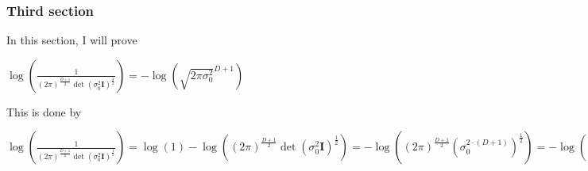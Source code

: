 \documentclass{report}
\begin{document}
\subsubsection*{Third section}
In this section, I will prove
\begin{center}
    \begin{math}
        \log \left( \frac{1}{(2 \pi)^\frac{D+1}{2} \det(\sigma_0^2 \bm{I})^\frac{1}{2}} \right) 
        = - \log \left( \sqrt{2 \pi \sigma_0^2}^{D + 1} \right)
    \end{math}
\end{center}
This is done by
\begin{center}
    \begin{math}
        \log \left( \frac{1}{(2 \pi)^\frac{D+1}{2} \det(\sigma_0^2 \bm{I})^\frac{1}{2}} \right) 
        = \log(1) - \log((2 \pi)^\frac{D+1}{2} \det(\sigma_0^2 \bm{I})^\frac{1}{2})
        = - \log((2 \pi)^\frac{D+1}{2} \left( \sigma_0^{2 \cdot (D + 1)} \right)^\frac{1}{2})
        = - \log((2 \pi)^\frac{D+1}{2} \left( \sigma_0^{2} \right)^\frac{D + 1}{2})
        = - \log((2 \pi)^{\left(\frac{1}{2}\right)^D} \left( \sigma_0^{2} \right)^{\left(\frac{1}{2}\right)^D})
        = - \log (2 \pi \sigma_0^{2})^{\left(\frac{1}{2}\right)^D}
        = - \log \sqrt{(2 \pi \sigma_0^{2})}^D
    \end{math}
\end{center}
\end{document}
